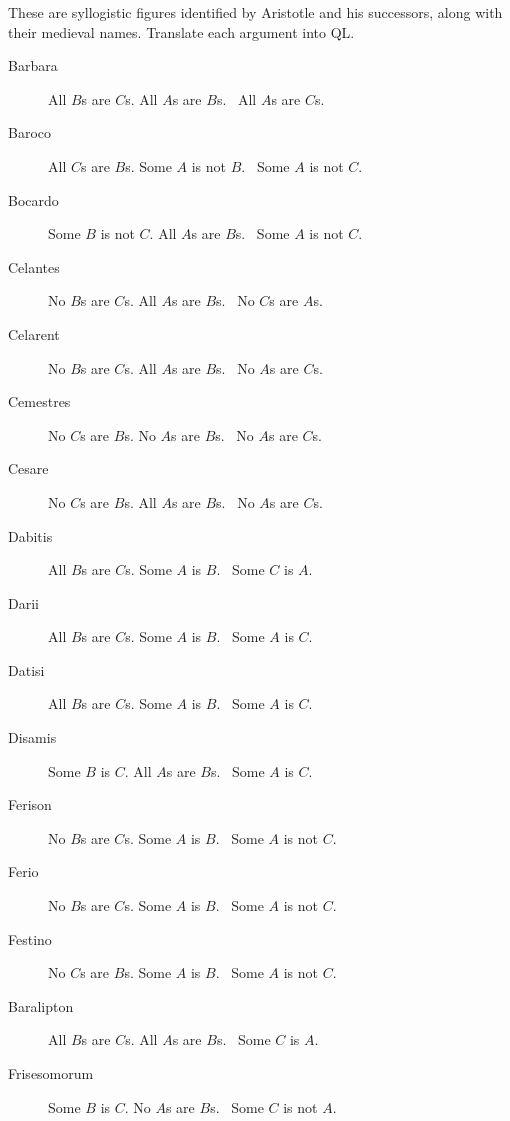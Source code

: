 \problempart
\label{pr.BarbaraEtc}
These are syllogistic figures identified by Aristotle and his successors, along with their medieval names. Translate each argument into QL.
\begin{description}
\item[Barbara] All $B$s are $C$s. All $A$s are $B$s.
	\therefore\  All $A$s are $C$s.
\item[Baroco] All $C$s are $B$s. Some $A$ is not $B$.
	\therefore\  Some $A$ is not $C$.
\item[Bocardo] Some $B$ is not $C$. All $A$s are $B$s.
	\therefore\  Some $A$ is not $C$.
\item[Celantes] No $B$s are $C$s. All $A$s are $B$s.
	\therefore\  No $C$s are $A$s.
\item[Celarent] No $B$s are $C$s. All $A$s are $B$s.
	\therefore\  No $A$s are $C$s.
\item[Cemestres] No $C$s are $B$s. No $A$s are $B$s.
	\therefore\  No $A$s are $C$s.
\item[Cesare] No $C$s are $B$s. All $A$s are $B$s.
	\therefore\  No $A$s are $C$s.
\item[Dabitis] All $B$s are $C$s. Some $A$ is $B$.
	\therefore\  Some $C$ is $A$.
\item[Darii] All $B$s are $C$s. Some $A$ is $B$.
	\therefore\  Some $A$ is $C$.
\item[Datisi] All $B$s are $C$s. Some $A$ is $B$.
	\therefore\  Some $A$ is $C$.
\item[Disamis] Some $B$ is $C$. All $A$s are $B$s.
	\therefore\  Some $A$ is $C$.
\item[Ferison] No $B$s are $C$s. Some $A$ is $B$.
	\therefore\  Some $A$ is not $C$.
\item[Ferio] No $B$s are $C$s. Some $A$ is $B$.
	\therefore\  Some $A$ is not $C$.
\item[Festino] No $C$s are $B$s. Some $A$ is $B$.
	\therefore\  Some $A$ is not $C$.
\item[Baralipton] All $B$s are $C$s. All $A$s are $B$s.
	\therefore\  Some $C$ is $A$.
\item[Frisesomorum] Some $B$ is $C$. No $A$s are $B$s.
	\therefore\  Some $C$ is not $A$.
\end{description}



